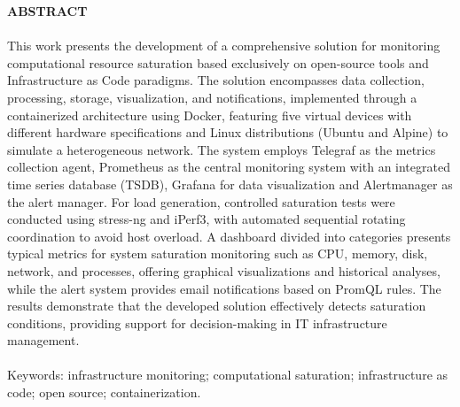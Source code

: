 \begin{center}

\textbf{ABSTRACT}

\end{center}

\vspace{0.5cm}

\paragraph{}
{\color{red}
This work presents the development of a comprehensive solution for monitoring computational resource saturation based exclusively on open-source tools and Infrastructure as Code paradigms. The solution encompasses data collection, processing, storage, visualization, and notifications, implemented through a containerized architecture using Docker, featuring five virtual devices with different hardware specifications and Linux distributions (Ubuntu and Alpine) to simulate a heterogeneous network. The system employs Telegraf as the metrics collection agent, Prometheus as the central monitoring system with an integrated time series database (TSDB), Grafana for data visualization and Alertmanager as the alert manager. For load generation, controlled saturation tests were conducted using stress-ng and iPerf3, with automated sequential rotating coordination to avoid host overload. A dashboard divided into categories presents typical metrics for system saturation monitoring such as CPU, memory, disk, network, and processes, offering graphical visualizations and historical analyses, while the alert system provides email notifications based on PromQL rules. The results demonstrate that the developed solution effectively detects saturation conditions, providing support for decision-making in IT infrastructure management.

\paragraph{}

\noindent Keywords: infrastructure monitoring; computational saturation; infrastructure as code; open source; containerization.
}
\pagebreak
